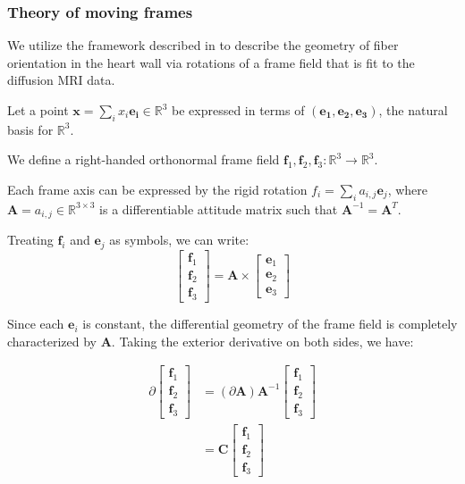 \subsubsection{Theory of moving frames}

We utilize the framework described in \cite{de1990ventricular} to describe the geometry of fiber orientation in the heart wall via rotations of a frame field that is fit to the diffusion MRI data. 

Let a point $\mathbf{x} = \sum_i{x_i\mathbf{e_i}} \in \mathbb{R}^3$ be expressed in terms of $(\mathbf{e_1}, \mathbf{e_2}, \mathbf{e_3})$, the natural basis for $\mathbb{R}^3$. 

We define a right-handed orthonormal frame field $\mathbf{f}_1,\mathbf{f}_2,\mathbf{f}_3 : \mathbb{R}^3 \to \mathbb{R}^3$.

Each frame axis can be expressed by the rigid rotation $f_i = \sum_i{a_{i,j}\mathbf{e}_j}$, where $\mathbf{A} = {a_{i,j}} \in \mathbb{R}^{3 \times 3}$ is a differentiable attitude matrix such that $\mathbf{A}^{-1} = \mathbf{A}^T$.

Treating $\mathbf{f}_i$ and $\mathbf{e}_j$ as symbols, we can write:
\begin{equation}
\begin{bmatrix}
    \mathbf{f}_1 \\
    \mathbf{f}_2 \\
    \mathbf{f}_3
\end{bmatrix} = \mathbf{A} \times \begin{bmatrix}
    \mathbf{e}_1 \\
    \mathbf{e}_2 \\
    \mathbf{e}_3
\end{bmatrix}
\end{equation}

Since each $\mathbf{e}_i$ is constant, the differential geometry of the frame field is completely characterized by $\mathbf{A}$. Taking the exterior derivative on both sides, we have:

\begin{align} \label{eq:1}
    \partial \begin{bmatrix}
                \mathbf{f}_1 \\
                \mathbf{f}_2 \\
                \mathbf{f}_3
            \end{bmatrix} &= (\partial \mathbf{A})\mathbf{A}^{-1}  \begin{bmatrix}
                \mathbf{f}_1 \\
                \mathbf{f}_2 \\
                \mathbf{f}_3
            \end{bmatrix} \\
            &= \mathbf{C}
            \begin{bmatrix}
                \mathbf{f}_1 \\
                \mathbf{f}_2 \\
                \mathbf{f}_3
            \end{bmatrix}
\end{align}

